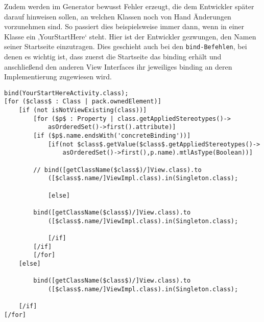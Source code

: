 Zudem werden im Generator bewusst Fehler erzeugt, die dem Entwickler später darauf hinweisen sollen, an welchen Klassen noch von Hand Änderungen vorzunehmen sind. So passiert dies beispielsweise immer dann, wenn in einer Klasse ein ‚YourStartHere‘ steht. Hier ist der Entwickler gezwungen, den Namen seiner Startseite einzutragen. Dies geschieht auch bei den \texttt{bind-Befehlen}, bei denen es wichtig ist, dass zuerst die Startseite das binding erhält und anschließend den anderen View Interfaces ihr jeweiliges binding an deren Implementierung zugewiesen wird.
\lstset{language=mtl}
\begin{lstlisting}[caption={Auszug aus der Generierung des \texttt{bind}-Befehls}, label={BSPCodeBind}]
bind(YourStartHereActivity.class);  
[for ($class$ : Class | pack.ownedElement)]
	[if (not isNotViewExisting(class))]
		[for ($p$ : Property | class.getAppliedStereotypes()->
			asOrderedSet()->first().attribute)]
		[if ($p$.name.endsWith('concreteBinding'))]
			[if(not $class$.getValue($class$.getAppliedStereotypes()->
				asOrderedSet()->first(),p.name).mtlAsType(Boolean))]

		// bind([getClassName($class$)/]View.class).to
			([$class$.name/]ViewImpl.class).in(Singleton.class);

			[else]

		bind([getClassName($class$)/]View.class).to
			([$class$.name/]ViewImpl.class).in(Singleton.class);

			[/if]
		[/if]
		[/for]
	[else]

		bind([getClassName($class$)/]View.class).to
			([$class$.name/]ViewImpl.class).in(Singleton.class);

	[/if]	
[/for]
\end{lstlisting}

